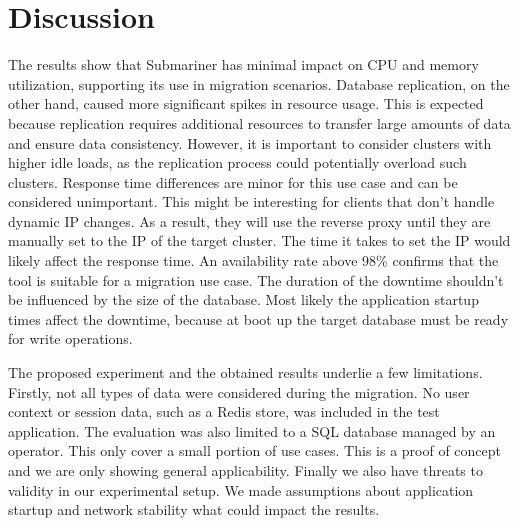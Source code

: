 %
\section{Discussion}
\label{sec:discussion}
%
The results show that Submariner has minimal impact on CPU and memory utilization, supporting its use in migration scenarios.
Database replication, on the other hand, caused more significant spikes in resource usage.
This is expected because replication requires additional resources to transfer large amounts of data and ensure data consistency.
However, it is important to consider clusters with higher idle loads, as the replication process could potentially overload such clusters.
Response time differences are minor for this use case and can be considered unimportant.
This might be interesting for clients that don't handle dynamic IP changes.
As a result, they will use the reverse proxy until they are manually set to the IP of the target cluster.
The time it takes to set the IP would likely affect the response time.
An availability rate above 98\% confirms that the tool is suitable for a migration use case. 
The duration of the downtime shouldn't be influenced by the size of the database. 
Most likely the application startup times affect the downtime, because at boot up the target database must be ready for write operations.

The proposed experiment and the obtained results underlie a few limitations.
Firstly, not all types of data were considered during the migration.
No user context or session data, such as a Redis store, was included in the test application.
The evaluation was also limited to a SQL database managed by an operator.
This only cover a small portion of use cases.
This is a proof of concept and we are only showing general applicability.
Finally we also have threats to validity in our experimental setup.
We made assumptions about application startup and network stability what could impact the results.